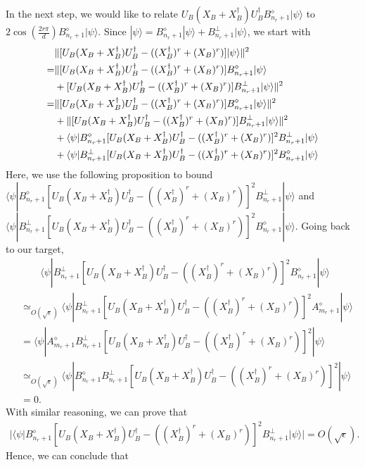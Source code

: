 \documentclass[11pt,letterpaper]{article}
\newcommand{\ket}[1]{|#1\rangle}
\newcommand{\bra}[1]{\langle#1|}
\newcommand{\ct}{^{\dagger}}
\DeclarePairedDelimiter{\norm}{\lVert}{\rVert}
\newcommand{\1}{\mathbb{1}}
\newcommand{\appd}[1]{\simeq_{#1}}
\theoremstyle{definition}
\begin{document}
In the next step, we would like to 
relate $U_B(X_B+X_B\ct)U_B\ct B_{n_r+1}^\diamond \ket{\psi}$ to $2\cos(\frac{2r\pi}{d}) B_{n_r+1}^\diamond \ket{\psi}$.
Since $\ket{\psi} = B_{n_r+1}^\diamond \ket{\psi} + B_{n_r+1}^\perp \ket{\psi}$, we start with
\begin{align*}
	&\norm{[U_B(X_B+X_B\ct)U_B\ct - ((X_B\ct)^r+(X_B)^r)]\ket{\psi}}^2\\
	= &\norm{[U_B(X_B+X_B\ct)U_B\ct - ((X_B\ct)^r+(X_B)^r)]B_{n_r+1}^\diamond \ket{\psi}\\
	&+ [U_B(X_B+X_B\ct)U_B\ct - ((X_B\ct)^r+(X_B)^r)]B_{n_r+1}^\perp \ket{\psi}}^2\\
	=&\norm{[U_B(X_B+X_B\ct)U_B\ct - ((X_B\ct)^r+(X_B)^r)]B_{n_r+1}^\diamond \ket{\psi}}^2 \\
	&+\norm{[U_B(X_B+X_B\ct)U_B\ct - ((X_B\ct)^r+(X_B)^r)]B_{n_r+1}^\perp \ket{\psi}}^2 \\
	&+\bra{\psi} B_{n_r+1}^\diamond [U_B(X_B+X_B\ct)U_B\ct - ((X_B\ct)^r+(X_B)^r)]^2 B_{n_r+1}^\perp \ket{\psi}\\
	&+\bra{\psi} B_{n_r+1}^\perp [U_B(X_B+X_B\ct)U_B\ct - ((X_B\ct)^r+(X_B)^r)]^2 B_{n_r+1}^\diamond \ket{\psi}
\end{align*}
Here, we use the following proposition to bound $\bra{\psi} B_{n_r+1}^\diamond [U_B(X_B+X_B\ct)U_B\ct - ((X_B\ct)^r+(X_B)^r)]^2 B_{n_r+1}^\perp \ket{\psi}$ and $\bra{\psi} B_{n_r+1}^\perp [U_B(X_B+X_B\ct)U_B\ct - ((X_B\ct)^r+(X_B)^r)]^2 B_{n_r+1}^\diamond \ket{\psi}$.
Going back to our target,
\begin{align}
	&\qquad\bra{\psi} B_{n_r+1}^\perp [U_B(X_B+X_B\ct)U_B\ct - ((X_B\ct)^r+(X_B)^r)]^2 B_{n_r+1}^\diamond \ket{\psi} \\
	&\appd{O(\sqrt{\epsilon})} \bra{\psi} B_{n_r+1}^\perp [U_B(X_B+X_B\ct)U_B\ct - ((X_B\ct)^r+(X_B)^r)]^2 A_{m_r+1}^\diamond \ket{\psi} \\
	&=\bra{\psi} A_{m_r+1}^\diamond B_{n_r+1}^\perp[U_B(X_B+X_B\ct)U_B\ct - ((X_B\ct)^r+(X_B)^r)]^2 \ket{\psi}\\
	&\appd{O(\sqrt{\epsilon})} \bra{\psi} B_{n_r+1}^\diamond B_{n_r+1}^\perp[U_B(X_B+X_B\ct)U_B\ct - ((X_B\ct)^r+(X_B)^r)]^2 \ket{\psi}\\
	&= 0.
\end{align}
With similar reasoning, we can prove that
\begin{align}
	|\bra{\psi} B_{n_r+1}^\diamond [U_B(X_B+X_B\ct)U_B\ct - ((X_B\ct)^r+(X_B)^r)]^2 B_{n_r+1}^\perp \ket{\psi}| = O(\sqrt{\epsilon}).
\end{align}	
Hence, we can conclude that 
\end{document}
